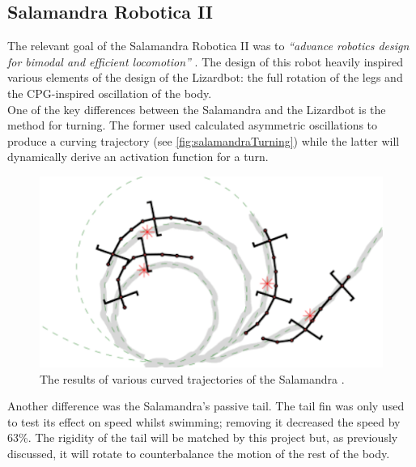 \documentclass{article}
\begin{document}
\newpage
\subsection{Salamandra Robotica II}
\label{sec:Salamandra Roboticaa II}
The relevant goal of the Salamandra Robotica II  was to \textit{“advance robotics design for bimodal and efficient locomotion”} . The design of this robot heavily inspired various elements of the design of the Lizardbot: the full rotation of the legs and the CPG-inspired oscillation of the body. \\
One of the key differences between the Salamandra and the Lizardbot is the method for turning. The former used calculated asymmetric oscillations to produce a curving trajectory (see \autoref{fig:salamandraTurning}) while the latter will dynamically derive an activation function for a turn. \\
\begin{figure}[H]
\centering
\includegraphics[scale=0.7]{salamandraTurning}
\caption{The results of various curved trajectories of the Salamandra \citep{salamandra}.}
\label{fig:salamandraTurning}
\end{figure}
Another difference was the Salamandra’s passive tail. The tail fin was only used to test its effect on speed whilst swimming; removing it decreased the speed by 63\%. The rigidity of the tail will be matched by this project but, as previously discussed, it will rotate to counterbalance the motion of the rest of the body.
\end{document}
